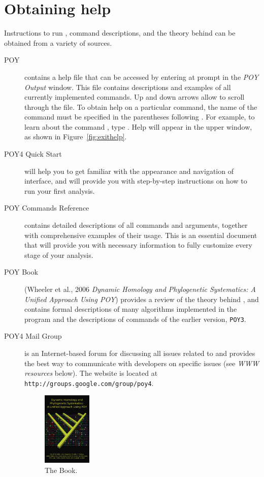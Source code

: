 \section{Obtaining help} \label{sec:help}
Instructions to run \poy, command descriptions, and the theory behind \poy can be obtained from a variety of sources.
\begin{description}
\item[POY] contains a help file that can be accessed by entering  at \poy prompt in the \emph{POY Output} window. This file contains descriptions and examples of all currently implemented \poy commands. Up and down arrows allow to scroll through the file. To obtain help on a particular command, the name of the command must be specified in the parentheses following . For example, to learn about the command , type . Help will appear in the upper window, as shown in Figure~\ref{fig:exithelp}.
\item[POY4 Quick Start] will help you to get familiar with the appearance and navigation of \poy interface, and will provide you with step-by-step instructions on how to run your first analysis.
\item[POY Commands Reference] contains detailed descriptions of all \poy commands and arguments, together with comprehensive examples of their usage. This is an essential document that will provide you with necessary information to fully customize every stage of your analysis.
\item[POY Book] (Wheeler et al., 2006 \emph{Dynamic Homology and Phylogenetic Systematics: A Unified Approach Using POY}) provides a review of the theory behind \poy, and contains formal descriptions of many algorithms implemented in the program and the descriptions of commands of the earlier version, \texttt{POY3}.
\item[POY4 Mail Group] is an Internet-based forum for discussing all issues related to \poy and provides the best way to communicate with \poy developers on specific issues (see \emph{WWW resources} below). The website is located at \texttt{http://groups.google.com/group/poy4}.
\begin{figure}[htbp]
   \centering
   \includegraphics[width=0.23\textwidth]{figures/figPOYBook.jpg}
   \caption{The \poy Book.}
   \label{fig:figprocess}
\end{figure}
\end{description}
